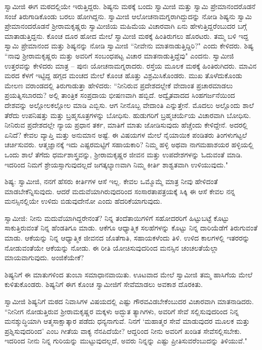 ಸ್ವಾಮೀಜಿ ಈಗ ಮಠದಲ್ಲಿಯೇ ಇರುತ್ತಿದ್ದರು. ಶಿಷ್ಯನು ಮಠಕ್ಕೆ ಬಂದು ಸ್ವಾಮೀಜಿ ಮತ್ತು ಸ್ವಾಮಿ ಪ್ರೇಮಾನಂದರೊಡನೆ ಸಂಜೆ ತಿರುಗಾಡಿಕೊಂಡು ಬರಲು ಹೋಗಿದ್ದನು. ಸ್ವಾಮೀಜಿ ಆಲೋಚನಾಮಗ್ನರಾಗಿದ್ದುದನ್ನು ನೋಡಿ ಶಿಷ್ಯನು ಸ್ವಾಮಿ ಪ್ರೇಮಾನಂದರೊಡನೆ ಶ‍್ರೀರಾಮಕೃಷ್ಣರು ಸ್ವಾಮೀಜಿಯ ಮಹಿಮೆಯ ವಿಚಾರವಾಗಿ ಏನು ಹೇಳುತ್ತಿದ್ದರೆಂಬುದರ ಬಗ್ಗೆ ಮಾತಾಡುತ್ತಿದ್ದನು. ಕೊಂಚ ದೂರ ಹೋದ ಮೇಲೆ ಸ್ವಾಮೀಜಿ ಮಠಕ್ಕೆ ಹಿಂತಿರುಗಲು ಹೊರಟರು. ತಮ್ಮ ಬಳಿ ಇದ್ದ ಸ್ವಾಮಿ ಪ್ರೇಮಾನಂದ ಮತ್ತು ಶಿಷ್ಯನನ್ನು ನೋಡಿ ಸ್ವಾಮೀಜಿ “ನೀವೇನು ಮಾತನಾಡುತ್ತಿದ್ದಿರಿ?" ಎಂದು ಕೇಳಿದರು. ಶಿಷ್ಯ “ನಾವು ಶ‍್ರೀರಾಮಕೃಷ್ಣರು ಮತ್ತು ಅವರಿಗೆ ಸಂಬಂಧಪಟ್ಟ ವಿಚಾರ ಮಾತನಾಡುತ್ತಿದ್ದೆವು" ಎಂದನು. ಸ್ವಾಮೀಜಿ ಉತ್ತರವನ್ನು ಕೇಳಿದರು ಮಾತ್ರ – ಪುನಃ ಯೋಚನಾಮಗ್ನರಾದರು. ರಸ್ತೆಯ ಮೂಲಕ ಮಠಕ್ಕೆ ಹಿಂತಿರುಗಿದರು. ಮಾವಿನ ಮರದ ಕೆಳಗೆ ಇಟ್ಟಿದ್ದ ಹಗ್ಗದ ಮಂಚದ ಮೇಲೆ ಕೊಂಚ ಹೊತ್ತು ವಿಶ್ರಮಿಸಿಕೊಂಡರು. ಮುಖ ತೊಳೆದುಕೊಂಡು ಮೇಲಣ ವರಾಂಡದಲ್ಲಿ ತಿರುಗಾಡುತ್ತಾ ಹೇಳಿದರು: “ನೀನಿರುವ ಪ್ರದೇಶದಲ್ಲೇಕೆ ವೇದಾಂತ ಪ್ರಚಾರಮಾಡಲು ಪ್ರಯತ್ನಿಸಬಾರದು? ಅಲ್ಲಿ ತಾಂತ್ರಿಕ ಸಂಪ್ರದಾಯ ಭೀಷಣವಾಗಿ ಹಬ್ಬಿದೆ. ಅದ್ವೈತವಾದದ ಸಿಂಹಗರ್ಜನೆಯಿಂದ ದೇಶವನ್ನು ಅಲ್ಲೋಲಕಲ್ಲೋಲ ಮಾಡಿ ಎಬ್ಬಿಸು. ಆಗ ನೀನೊಬ್ಬ ವೇದಾಂತಿ ಎನ್ನುತ್ತೇನೆ. ಮೊದಲು ಅಲ್ಲೊಂದು ಶಾಲೆ ತೆರೆದು ಉಪನಿಷತ್ತು ಮತ್ತು ಬ್ರಹ್ಮಸೂತ್ರಗಳನ್ನು ಬೋಧಿಸು. ಹುಡುಗರಿಗೆ ಬ್ರಹ್ಮಚರ್ಯೆಯ ವಿಚಾರವಾಗಿ ಬೋಧಿಸು. ನೀನಿರುವ ಪ್ರದೇಶದಲ್ಲೇ ನ್ಯಾಯ ಪ್ರಧಾನ ತರ್ಕ, ಮಾತಿಗೆ ಮಾತು ಜೋಡಿಸುವುದು ಹೆಚ್ಚೆಂದು ಕೇಳಿದ್ದೇನೆ. ಅದರಲ್ಲಿ ಏನಿದೆ? ಕೇವಲ ವ್ಯಾಪ್ತಿ ಮತ್ತು ಅನುಮಾನ ಅಷ್ಟೆ. ಈ ವಿಷಯಗಳ ಮೇಲೆ ನೈಯಾಯಿಕ ಪಂಡಿತರು ತಿಂಗಳುಗಟ್ಟಲೆ ಚರ್ಚಿಸುವರು. ಆತ್ಮಜ್ಞಾನಕ್ಕೆ ಇದು ಎಷ್ಟರಮಟ್ಟಿಗೆ ಸಹಾಯಕಾರಿ? ನಿಮ್ಮ ಹಳ್ಳಿ ಅಥವಾ ನಾಗಮಹಾಶಯರ ಹಳ್ಳಿಯಲ್ಲಿ ಒಂದು ಶಾಲೆ ತೆಗೆದು ಧರ್ಮಶಾಸ್ತ್ರವನ್ನು, ಶ‍್ರೀರಾಮಕೃಷ್ಣರ ಜೀವನ ಮತ್ತು ಉಪದೇಶಗಳನ್ನು ಓದುವಂತೆ ಮಾಡಿ. ಇದರಿಂದ ನಿಮಗೆ ಶ್ರೇಯಸ್ಸಾಗುವುದಲ್ಲದೆ ಜಗತ್ಕಲ್ಯಾಣವಾಗಿ ನಿಮ್ಮ ಕೀರ್ತಿ ಶಾಶ್ವತವಾಗಿ ಉಳಿಯುವುದು."

ಶಿಷ್ಯ: ಸ್ವಾಮೀಜಿ, ನನಗೆ ಹೆಸರು ಕೀರ್ತಿಗಳ ಆಸೆ ಇಲ್ಲ. ಕೇವಲ ಒಮ್ಮೊಮ್ಮೆ ಮಾತ್ರ ನೀವು ಹೇಳಿದಂತೆ ಮಾಡಬೇಕೆನ್ನಿಸುವುದು. ಆದರೆ ಮದುವೆಯಾಗಿರುವುದರಿಂದ ಸಂಸಾರತಾಪತ್ರಯಕ್ಕೆ ಸಿಕ್ಕಿ ಈ ಆಸೆ ಕೇವಲ ನನ್ನ ಮನಸ್ಸಿನಲ್ಲಿಯೇ ಉಳಿದು ಬಿಡುವುದೇನೋ ಎಂದು ಹೆದರಿಕೆಯಾಗುವುದು.

ಸ್ವಾಮೀಜಿ: ನೀನು ಮದುವೆಯಾಗಿದ್ದರೇನಂತೆ? ನಿನ್ನ ತಂದೆತಾಯಿಗಳಿಗೆ ಸಹೋದರರಿಗೆ ಹಿಟ್ಟುಬಟ್ಟೆ ಕೊಟ್ಟು ಸಾಕುತ್ತಿರುವಂತೆ ನಿನ್ನ ಹೆಂಡತಿಗೂ ಮಾಡು. ಆಕೆಗೂ ಆಧ್ಯಾತ್ಮಿಕ ಸಲಹೆಗಳನ್ನು ಕೊಟ್ಟು ನಿನ್ನ ದಾರಿಯೆಡೆಗೆ ತಿರುಗುವಂತೆ ಮಾಡು. ಆಕೆಯನ್ನು ನಿನ್ನ ಆಧ್ಯಾತ್ಮಿಕ ಜೀವನದ ಜೊತೆಗಾತಿ, ಸಹಾಯಕಳೆಂದು ತಿಳಿ. ಉಳಿದ ಕಾಲಗಳಲ್ಲಿ ಇತರರನ್ನು ನೋಡುವಂತೆಯೇ ಆಕೆಯನ್ನು ನೋಡು. ಈ ರೀತಿ ಯೋಚಿಸುವುದರಿಂದ ಮನಸ್ಸಿನ ಚಂಚಲತೆಯೆಲ್ಲಾ ಮಾಯವಾಗುವುದು. ಅಂಜಿಕೆಯೇಕೆ?

ಶಿಷ್ಯನಿಗೆ ಈ ಮಾತುಗಳಿಂದ ತುಂಬಾ ಸಮಾಧಾನವಾಯಿತು. ಊಟವಾದ ಮೇಲೆ ಸ್ವಾಮೀಜಿ ತಮ್ಮ ಹಾಸಿಗೆಯ ಮೇಲೆ ಕುಳಿತುಕೊಂಡರು. ಶಿಷ್ಯನಿಗೆ ಈಗ ಕೊಂಚ ಸ್ವಾಮೀಜಿಗೆ ಸೇವೆಮಾಡಲು ಅವಕಾಶ ದೊರಕಿತು.

ಸ್ವಾಮೀಜಿ ಶಿಷ್ಯನಿಗೆ ಮಠದ ನಿವಾಸಿಗಳ ವಿಷಯದಲ್ಲಿ ಎಷ್ಟು ಗೌರವವಿಡಬೇಕೆಂಬುದರ ವಿಚಾರವಾಗಿ ಮಾತನಾಡಿದರು. “ನೀನೀಗ ನೋಡುತ್ತಿರುವ ಶ‍್ರೀರಾಮಕೃಷ್ಣರ ಮಕ್ಕಳು ಅದ್ಭುತ ತ್ಯಾಗಿಗಳು, ಅವರಿಗೆ ಸೇವೆ ಸಲ್ಲಿಸುವುದರಿಂದ ನಿನ್ನ ಮನಶ್ಶುದ್ಧಿಯಾಗಿ ಆತ್ಮಸಾಕ್ಷಾತ್ಕಾರ ಪಡೆದು ಧನ್ಯನಾಗುವೆ. ನಿನಗೆ ‘ಮಹಾತ್ಮರ ಸೇವೆ ಮಾಡುವುದರ ಮೂಲಕ ಮತ್ತು ಪ್ರಶ್ನಿಸುವುದರಿಂದ’ ಎಂಬ ಗೀತೆಯ ವಾಕ್ಯ ನೆನಪಿದೆಯೇ? ಆದ್ದರಿಂದ ನೀನು ಅವರಿಗೆ ಖಂಡಿತ ಸೇವೆಸಲ್ಲಿಸಬೇಕು. ಇದರಿಂದ ನೀನು ನಿನ್ನ ಗುರಿಯನ್ನು ಮುಟ್ಟುವುದಲ್ಲದೆ, ಅವರು ನಿನ್ನನ್ನು ಎಷ್ಟು ಪ್ರೀತಿಸುವರೆಂಬುದನ್ನು ತಿಳಿಯುವೆ."

